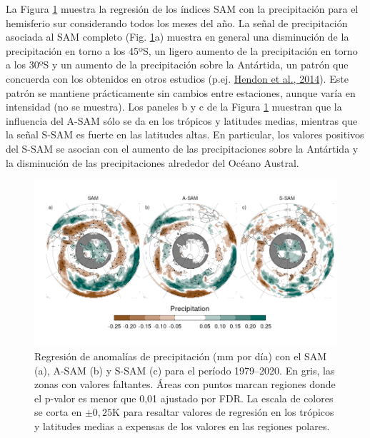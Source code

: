 \documentclass[12pt,oneside,a4paper]{reedthesis}
\begin{document}
La Figura \ref{fig:global-pp} muestra la regresión de los índices SAM con la precipitación para el hemisferio sur considerando todos los meses del año.
La señal de precipitación asociada al SAM completo (Fig. \ref{fig:global-pp}a) muestra en general una disminución de la precipitación en torno a los 45ºS, un ligero aumento de la precipitación en torno a los 30ºS y un aumento de la precipitación sobre la Antártida, un patrón que concuerda con los obtenidos en otros estudios (p.ej. \protect\hyperlink{ref-hendon2014}{Hendon et al., 2014}).
Este patrón se mantiene prácticamente sin cambios entre estaciones, aunque varía en intensidad (no se muestra).
Los paneles b y c de la Figura \ref{fig:global-pp} muestran que la influencia del A-SAM sólo se da en los trópicos y latitudes medias, mientras que la señal S-SAM es fuerte en las latitudes altas.
En particular, los valores positivos del S-SAM se asocian con el aumento de las precipitaciones sobre la Antártida y la disminución de las precipitaciones alrededor del Océano Austral.



\begin{figure}

{\centering \includegraphics{figures/30-sam/global-pp-1} 

}

\caption{Regresión de anomalías de precipitación (mm por día) con el SAM (a), A-SAM (b) y S-SAM (c) para el período 1979--2020. En gris, las zonas con valores faltantes. Áreas con puntos marcan regiones donde el p-valor es menor que 0,01 ajustado por FDR. La escala de colores se corta en \(\pm0,25 \mathrm{K}\) para resaltar valores de regresión en los trópicos y latitudes medias a expensas de los valores en las regiones polares.}\label{fig:global-pp}
\end{figure}
\end{document}
